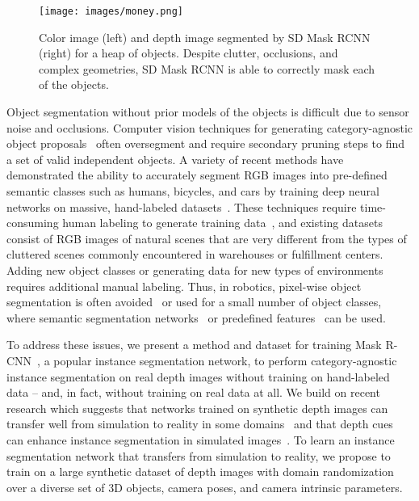 \documentclass[letterpaper, 10 pt, conference]{ieeeconf}  \pdfoutput=1
\numberwithin{equation}{section}
\begin{document}
\begin{figure}[t!]
    \centering
    \texttt{[image: images/money.png]}
    \caption{Color image (left) and depth image segmented by SD Mask RCNN (right) for a heap of objects. Despite clutter, occlusions, and complex geometries, SD Mask RCNN is able to correctly mask each of the objects.
    \vspace{-2ex}
    }
  \label{fig:real_dataset} 
\end{figure}

Object segmentation without prior models of the objects is difficult due to sensor noise and occlusions.
Computer vision techniques for generating category-agnostic object proposals~\cite{arbelaez2014multiscale, krahenbuhl2014geodesic} often oversegment and require secondary pruning steps to find a set of valid independent objects.
A variety of recent methods have demonstrated the ability to accurately segment RGB images into pre-defined semantic classes such as humans, bicycles, and cars by training deep neural networks on massive, hand-labeled datasets~\cite{long2015fully, he2017mask}.
These techniques require time-consuming human labeling to generate training data~\cite{lin2014microsoft}, and existing datasets consist of RGB images of natural scenes that are very different from the types of cluttered scenes commonly encountered in warehouses or fulfillment centers.
Adding new object classes or generating data for new types of environments requires additional manual labeling.
Thus, in robotics, pixel-wise object segmentation is often avoided~\cite{jang2017end, zeng2017multi} or used for a small number of object classes, where semantic segmentation networks~\cite{morrison2017cartman, schwarz2017nimbro} or predefined features~\cite{jonschkowski2016probabilistic} can be used.



To address these issues, we present a method and dataset for training Mask R-CNN~\cite{he2017mask}, a popular instance segmentation network, to perform category-agnostic instance segmentation on real depth images without training on hand-labeled data -- and, in fact, without training on real data at all.
We build on recent research which suggests that networks trained on synthetic depth images can transfer well from simulation to reality in some domains~\cite{johnson2017driving, mahler2017dex, ros2016synthia} and that depth cues can enhance instance segmentation in simulated images~\cite{shao2018clusternet}.  
To learn an instance segmentation network that transfers from simulation to reality, we propose to train on a large synthetic dataset of depth images with domain randomization~\cite{tobin2017domain} over a diverse set of 3D objects, camera poses, and camera intrinsic parameters.
\end{document}
